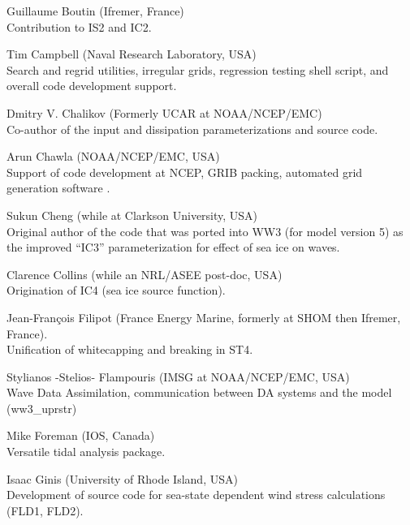 \begin{list}{\ldots}{ }
\item [Guillaume Boutin] (Ifremer, France) \\
  Contribution to IS2 and IC2. 

\item [Tim Campbell] (Naval Research Laboratory, USA)\\ 
  Search and regrid utilities, irregular grids, regression testing shell script, and overall code development support.

\item [Dmitry V. Chalikov] (Formerly UCAR at NOAA/NCEP/EMC) \\ Co-author of the
  \cite{tol:JPO96} input and dissipation parameterizations and source code.

\item [Arun Chawla](NOAA/NCEP/EMC, USA) \\
  Support of code development at NCEP, GRIB packing, automated grid generation
  software \citep{tol:MMAB07a, tol:OMOD08a}.

\item [Sukun Cheng] (while at Clarkson University, USA) \\
  Original author of the code that was ported into WW3 (for model version 5) as the improved ``IC3'' parameterization for effect of sea ice on waves.

\item [Clarence Collins] (while an NRL/ASEE post-doc, USA) \\
  Origination of IC4 (sea ice source function).

\item [Jean-Fran{\c c}ois Filipot] (France Energy Marine, formerly at SHOM then Ifremer, France).\\
  Unification of whitecapping and breaking in ST4. 

\item [Stylianos -Stelios- Flampouris] (IMSG at NOAA/NCEP/EMC, USA) \\
      Wave Data Assimilation, communication between DA systems and the model (ww3\_uprstr) 

\item [Mike Foreman]  (IOS, Canada) \\
  Versatile tidal analysis package. 

\item [Isaac Ginis] (University of Rhode Island, USA) \\
  Development of source code for sea-state dependent wind stress calculations (FLD1, FLD2).


\end{list}
